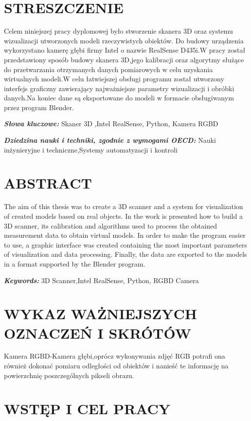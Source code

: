 \documentclass[12pt]{article}
\providecommand{\keywordspl}[1]
{
  \small	
  \textbf{\textit{Słowa kluczowe:}} #1 
}
\providecommand{\keywordseng}[1]
{
  \small	
  \textbf{\textit{Keywords:}} #1
}
\providecommand{\dnauki}[1]
{
  \small	
  \textbf{\textit{Dziedzina nauki i techniki, zgodnie z wymogami OECD:}} #1
}
\begin{document}
\section*{STRESZCZENIE}
Celem niniejszej pracy dyplomowej było stworzenie skanera 3D oraz systemu wizualizacji utworzonych modeli rzeczywistych obiektów. Do budowy urządzenia wykorzystano kamerę głębi firmy Intel o nazwie RealSense D435i.W pracy został przedstawiony sposób budowy skanera 3D,jego kalibracji oraz algorytmy służące do przetwarzania otrzymanych danych pomiarowych w celu uzyskania wirtualnych modeli.W celu łatwiejszej obsługi programu został utworzony interfejs graficzny zawierający najważniejsze parametry wizualizacji i obróbki danych.Na koniec dane są eksportowane do modeli w formacie obsługiwanym przez program Blender.

\keywordspl{Skaner 3D ,Intel RealSense, Python, Kamera RGBD}

\dnauki{Nauki inżynieryjne i techniczne,Systemy automatyzacji i kontroli }

\section*{ABSTRACT}
The aim of this thesis was to create a 3D scanner and a system for visualization of created models based on real objects. In the work is presented how to build a 3D scanner, its calibration and algorithms used to process the obtained measurement data to obtain virtual models. In order to make the program easier to use, a graphic interface was created containing the most important parameters of visualization and data processing. Finally, the data are exported to the models in a format supported by the Blender program.

\keywordseng{3D Scanner,Intel RealSense, Python, RGBD Camera}
\newpage
\tableofcontents





\newpage
\section{WYKAZ WAŻNIEJSZYCH OZNACZEŃ I SKRÓTÓW}

Kamera RGBD-Kamera głębi,oprócz wykonywania zdjęć RGB potrafi ona również dokonać pomiaru odległości od obiektów i nanieść te informację na powierzchnię poszczególnych pikseli obrazu.

\section{WSTĘP I CEL PRACY}
\end{document}
